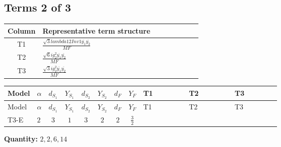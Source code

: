 \documentclass[8pt]{article}
\begin{document}
\begin{landscape}
\subsection*{Terms 2 of 3}
\begin{center}
\begin{tabular}{@{}c >{\raggedright\arraybackslash}p{0.82\linewidth}@{}}
\toprule
Column & Representative term structure \\
\midrule
T1 & \(\displaystyle \frac{\sqrt{3} lambda12Inv1 \overline{y_{1}} \overline{y_{2}}}{MF}\) \\
\midrule
T2 & \(\displaystyle \frac{\sqrt{6} i g_{2}^{2} \overline{y_{1}} \overline{y_{2}}}{MF}\) \\
\midrule
T3 & \(\displaystyle \frac{\sqrt{3} i g_{2}^{2} \overline{y_{1}} \overline{y_{2}}}{MF}\) \\
\midrule
\bottomrule
\end{tabular}
\end{center}
\smallskip
\tiny
\begin{longtable}{@{}llcccccc >{\raggedright\arraybackslash}p{0.21\linewidth} >{\raggedright\arraybackslash}p{0.21\linewidth} >{\raggedright\arraybackslash}p{0.21\linewidth}@{}}
\toprule
Model & $\alpha$ & $d_{S_1}$ & $Y_{S_1}$ & $d_{S_2}$ & $Y_{S_2}$ & $d_F$ & $Y_F$ & T1 & T2 & T3 \\
\midrule
\endfirsthead
\toprule
Model & $\alpha$ & $d_{S_1}$ & $Y_{S_1}$ & $d_{S_2}$ & $Y_{S_2}$ & $d_F$ & $Y_F$ & T1 & T2 & T3 \\
\midrule
\endhead
T3-E & $2$ & $3$ & $1$ & $3$ & $2$ & $2$ & $\frac{3}{2}$ & \scriptsize\adjustbox{max width=\linewidth}{$\begin{gathered} \frac{\sqrt{3} lambda12Inv1 \overline{y_{1}} \overline{y_{2}}}{6 MF}\end{gathered}$} & \scriptsize\adjustbox{max width=\linewidth}{$\begin{gathered} \frac{\sqrt{6} i g_{2}^{2} \overline{y_{1}} \overline{y_{2}}}{3 MF}\end{gathered}$} & \scriptsize\adjustbox{max width=\linewidth}{$\begin{gathered} \frac{\sqrt{3} i g_{2}^{2} \overline{y_{1}} \overline{y_{2}}}{6 MF}\end{gathered}$} \\
\midrule
\bottomrule
\end{longtable}
\clearpage
\noindent\textbf{Quantity: }$\mathrm{2,2,6,14}$\par\smallskip

\end{landscape}
\end{document}
